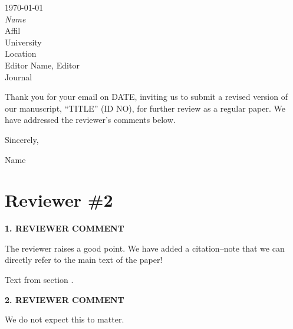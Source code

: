 \documentclass[11pt, letterpaper]{article}
\newenvironment{reviewer}{\bf}{}
\newenvironment{manuscript}[1]{\begin{center}\begin{tcolorbox}[colback=green!5!white,colframe=green!75!black,width=0.9\textwidth,title={#1},breakable,fonttitle=\bfseries]}{\end{tcolorbox}\end{center}}
\begin{document}
\today\\

{\itshape Name}\\
Affil\\
University\\
Location\\

{
Editor Name, Editor\\
Journal\\}

Thank you for your email on DATE, inviting us to submit a revised version of our manuscript, ``TITLE'' (ID NO), for further review as a regular paper. We have addressed the reviewer's comments below.


\hspace*{4.4in}Sincerely,


\hspace*{4.4in}Name

\section*{Reviewer \#2}
\begin{reviewer}
1. REVIEWER COMMENT
\end{reviewer}

The reviewer raises a good point. We have added a citation--note that we can directly refer to the main text of the paper!

\begin{manuscript}{Section}
Text from section \cite{Brown2010}.
\end{manuscript}

\begin{reviewer}
2. REVIEWER COMMENT
\end{reviewer}

We do not expect this to matter. 
\end{document}
